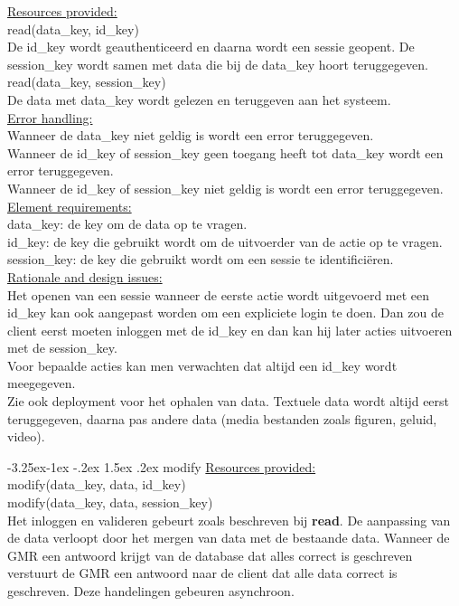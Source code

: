 \documentclass[a4paper,10pt]{book}
\makeatletter
\renewcommand\paragraph{\@startsection{paragraph}{4}{\z@}%
  {-3.25ex\@plus -1ex \@minus -.2ex}%
  {1.5ex \@plus .2ex}%
  {\normalfont\normalsize\bfseries}}
\makeatother
\begin{document}
\underline{Resources provided:}\\
read(data\_key, id\_key)\\
\indent De id\_key wordt geauthenticeerd en daarna wordt een sessie geopent.  De session\_key wordt samen met data die bij de data\_key hoort teruggegeven.\\
read(data\_key, session\_key)\\
\indent De data met data\_key wordt gelezen en teruggeven aan het systeem.\\

\underline{Error handling:}\\
Wanneer de data\_key niet geldig is wordt een error teruggegeven.\\
Wanneer de id\_key of session\_key geen toegang heeft tot data\_key wordt een error teruggegeven.\\
Wanneer de id\_key of session\_key niet geldig is wordt een error teruggegeven.\\

\underline{Element requirements:}\\
data\_key: de key om de data op te vragen.\\
id\_key: de key die gebruikt wordt om de uitvoerder van de actie op te vragen.\\
session\_key: de key die gebruikt wordt om een sessie te identifici\"{e}ren.\\

\underline{Rationale and design issues:}\\
Het openen van een sessie wanneer de eerste actie wordt uitgevoerd met een id\_key kan ook aangepast worden om een expliciete login te doen.  Dan zou de client eerst moeten inloggen met de id\_key en dan kan hij later acties uitvoeren met de session\_key.\\
Voor bepaalde acties kan men verwachten dat altijd een id\_key wordt meegegeven.\\
Zie ook deployment voor het ophalen van data.  Textuele data wordt altijd eerst teruggegeven, daarna pas andere data (media bestanden zoals figuren, geluid, video).



\paragraph{modify}
\underline{Resources provided:}\\
modify(data\_key, data, id\_key)\\
modify(data\_key, data, session\_key)\\
Het inloggen en valideren gebeurt zoals beschreven bij \textbf{read}.
De aanpassing van de data verloopt door het mergen van data met de bestaande data.  Wanneer de GMR een antwoord krijgt van de database dat alles correct is geschreven verstuurt de GMR een antwoord naar de client dat alle data correct is geschreven.  Deze handelingen gebeuren asynchroon.
\end{document}
